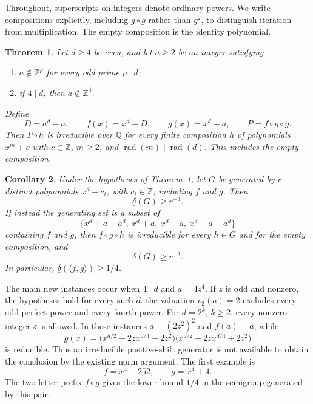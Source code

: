 \documentclass[11pt]{article}
\newtheorem{theorem}{Theorem}[section]
\newtheorem{corollary}[theorem]{Corollary}
\theoremstyle{remark}
\newcommand{\Q}{\mathbb{Q}}
\newcommand{\Z}{\mathbb{Z}}
\newcommand{\rad}{\operatorname{rad}}
\begin{document}
Throughout, superscripts on integers denote ordinary powers. We write compositions explicitly, including $g\circ g$ rather than $g^2$, to distinguish iteration from multiplication. The empty composition is the identity polynomial.

\begin{theorem}\label{thm:main}
Let $d\geq4$ be even, and let $a\geq2$ be an integer satisfying
\begin{enumerate}
\item $a\notin\Z^p$ for every odd prime $p\mid d$;
\item if $4\mid d$, then $a\notin\Z^4$.
\end{enumerate}
Define
\[
 D=a^d-a,\qquad f(x)=x^d-D,\qquad g(x)=x^d+a,
 \qquad P=f\circ g\circ g.
\]
Then $P\circ h$ is irreducible over $\Q$ for every finite composition $h$ of polynomials $x^m+c$ with $c\in\Z$, $m\geq2$, and $\rad(m)\mid\rad(d)$. This includes the empty composition.
\end{theorem}

\begin{corollary}\label{cor:density}
Under the hypotheses of Theorem~\ref{thm:main}, let $G$ be generated by $r$ distinct polynomials $x^d+c_i$, with $c_i\in\Z$, including $f$ and $g$. Then
\[
 \underline\delta(G)\geq r^{-3}.
\]
If instead the generating set is a subset of
\begin{equation}\label{eq:alphabet}
 \{x^d+a-a^d,\ x^d+a,\ x^d-a,\ x^d-a-a^d\}
\end{equation}
containing $f$ and $g$, then $f\circ g\circ h$ is irreducible for every $h\in G$ and for the empty composition, and
\[
 \underline\delta(G)\geq r^{-2}.
\]
In particular, $\underline\delta(\langle f,g\rangle)\geq1/4$.
\end{corollary}

The main new instances occur when $4\mid d$ and $a=4z^4$. If $z$ is odd and nonzero, the hypotheses hold for every such $d$: the valuation $v_2(a)=2$ excludes every odd perfect power and every fourth power. For $d=2^k$, $k\geq2$, every nonzero integer $z$ is allowed. In these instances $a=(2z^2)^2$ and $f(a)=a$, while
\begin{equation}\label{eq:sophie}
 g(x)=\bigl(x^{d/2}-2zx^{d/4}+2z^2\bigr)
       \bigl(x^{d/2}+2zx^{d/4}+2z^2\bigr)
\end{equation}
is reducible. Thus an irreducible positive-shift generator is not available to obtain the conclusion by the existing norm argument. The first example is
\[
 f=x^4-252,\qquad g=x^4+4.
\]
The two-letter prefix $f\circ g$ gives the lower bound $1/4$ in the semigroup generated by this pair.
\end{document}
